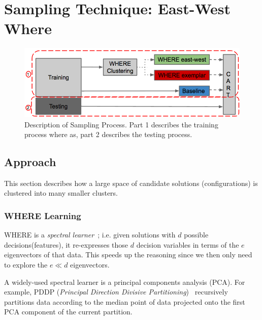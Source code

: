 \documentclass{sig-alternative}
\begin{document}
\section{Sampling Technique: East-West Where}
\begin{figure}[!t]
\includegraphics[width=0.9\linewidth]{Figures/SamplingProcess.png}
\caption{Description of Sampling Process. Part 1 describes the training process where as, part 2 describes the testing process.}\label{fig:Sampling Process}
\end{figure}
\subsection{Approach}
This section describes how a large space of candidate solutions (configurations) is clustered into many smaller clusters.
\subsubsection{WHERE Learning}\label{sec:spectral}


WHERE is a {\em spectral learner}~\cite{kamvar2003spectral}; i.e. given solutions with $d$ possible decisions(features), it re-expresses those $d$ decision variables in terms of the $e$ eigenvectors of that data.
This speeds up the reasoning since we then only need to explore the $e\ll d$   eigenvectors.

A widely-used spectral learner is a principal components analysis (PCA). For example, PDDP ({\em Principal Direction Divisive Partitioning})~\cite{boley1998principal} recursively partitions data according to the median point of data projected onto the first PCA component of the current partition.
\end{document}
